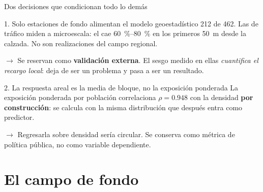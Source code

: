 \documentclass[11pt,aspectratio=169]{beamer}
\begin{document}
\begin{frame}{Dos decisiones que condicionan todo lo demás}
\vspace{-5mm}
\begin{block}{1. Solo estaciones de fondo alimentan el modelo geoestadístico}
\small
\num{212} de \num{462}. Las de tráfico miden a microescala: el  cae
\SIrange{60}{80}{\percent} en los primeros \SI{50}{\metre} desde la calzada.
No son realizaciones del campo regional.

\vspace{1.5mm}
$\rightarrow$ Se reservan como \textbf{validación externa}. El sesgo medido en
ellas \emph{cuantifica el recargo local}: deja de ser un problema y pasa a ser
un resultado.
\end{block}

\vspace{3mm}
\begin{block}{2. La respuesta areal es la media de bloque, no la exposición ponderada}
\small
La exposición ponderada por población correlaciona $\rho = \num{0.948}$ con la
densidad \textbf{por construcción}: se calcula con la misma distribución que
después entra como predictor.

\vspace{1.5mm}
$\rightarrow$ Regresarla sobre densidad sería circular. Se conserva como
métrica de política pública, no como variable dependiente.
\end{block}

\end{frame}

\section{El campo de fondo}
\end{document}
